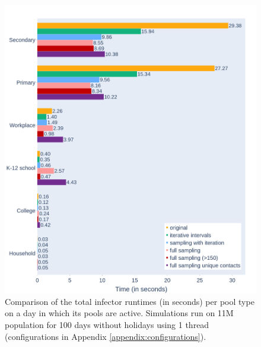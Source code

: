 \begin{figure}
    \centering
    \includegraphics[width=\linewidth]{4 - Sampling/fig/full_sampling_unique_contacts/fsuc_pType_vs_rest_type_totals.png}
    \caption{Comparison of the total infector runtimes (in seconds) per pool type on a day in which its pools are active. Simulations run on 11M population for 100 days without holidays using 1 thread (configurations in Appendix \ref{appendix:configurations}).}
    \label{fig:fsuc_pType_vs_rest_type_totals}
\end{figure}


